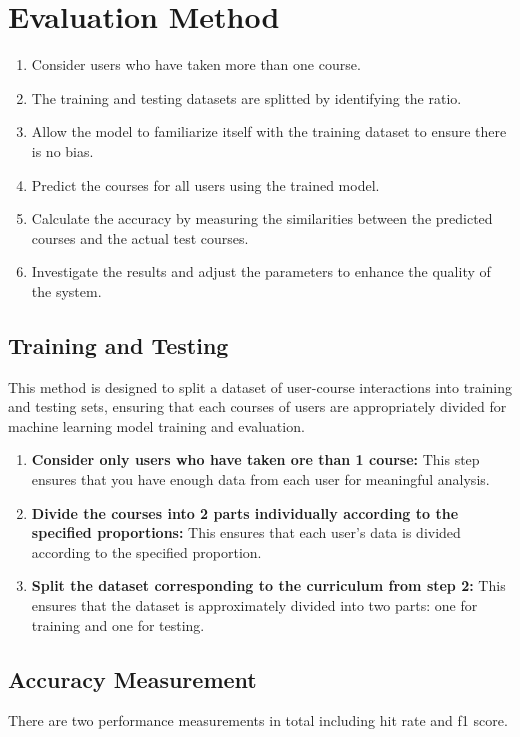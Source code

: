 \section{Evaluation Method}
\begin{enumerate}
    \item \textsf{Consider users who have taken more than one course.}
    \item \textsf{The training and testing datasets are splitted by identifying the ratio.}
    \item \textsf{Allow the model to familiarize itself with the training dataset to ensure there is no bias.}
    \item \textsf{Predict the courses for all users using the trained model.}
    \item \textsf{Calculate the accuracy by measuring the similarities between the predicted courses and the actual test courses.}
    \item \textsf{Investigate the results and adjust the parameters to enhance the quality of the system.}
\end{enumerate}

\subsection{Training and Testing}
This method is designed to split a dataset of user-course interactions into training and testing sets, ensuring that each courses of users are appropriately divided for machine learning model training and evaluation.
\begin{enumerate}
    \item \textsf{\textbf{Consider only users who have taken ore than 1 course: }
    This step ensures that you have enough data from each user for meaningful analysis.}
    \item \textsf{\textbf{Divide the courses into 2 parts individually according to the specified proportions: }
    This ensures that each user's data is divided according to the specified proportion.}
    \item \textsf{\textbf{Split the dataset corresponding to the curriculum from step 2: }
        This ensures that the dataset is approximately divided into two parts: one for training and one for testing.}
\end{enumerate}

\subsection{Accuracy Measurement}
There are two performance measurements in total including hit rate and f1 score.\\

